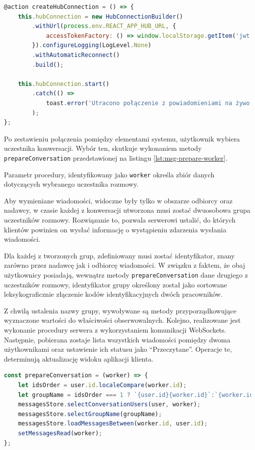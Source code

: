 \begin{lstlisting}[label=lst:msg-initHub,caption=Kod metody inicjującej połączenie WebSocket dla komunikatora tekstowego, captionpos=b,basicstyle=\footnotesize\ttfamily,language=JavaScript]
@action createHubConnection = () => {
	this.hubConnection = new HubConnectionBuilder()
		.withUrl(process.env.REACT_APP_HUB_URL, {
			accessTokenFactory: () => window.localStorage.getItem('jwt'),
		}).configureLogging(LogLevel.None)
		.withAutomaticReconnect()
		.build();

	this.hubConnection.start()
		.catch(() =>
			toast.error('Utracono połączenie z powiadomieniami na żywo. Odśwież stronę w celu ponownego połączenia')
		);
};
\end{lstlisting}

Po zestawieniu połączenia pomiędzy elementami systemu, użytkownik wybiera uczestnika konwersacji. Wybór ten, skutkuje wykonaniem metody \texttt{prepareConversation} przedstawionej na listingu \ref{lst:msg-prepare-worker}.

Parametr procedury, identyfikowany jako \texttt{worker} określa zbiór danych dotyczących wybranego uczestnika rozmowy.

Aby wymieniane wiadomości, widoczne były tylko w obszarze odbiorcy oraz nadawcy, w czasie każdej z konwersacji utworzona musi zostać dwuosobowa grupa uczestników rozmowy. Rozwiązanie to, pozwala serwerowi ustalić, do których klientów powinien on wysłać informację o wystąpieniu zdarzenia wysłania wiadomości.

Dla każdej z tworzonych grup, zdefiniowany musi zostać identyfikator, znany zarówno przez nadawcę jak i odbiorcę wiadomości. W związku z faktem, że obaj użytkownicy posiadają, wewnątrz metody \texttt{prepareConversation} dane drugiego z uczestników rozmowy, identyfikator grupy określony został jako sortowane leksykograficznie złączenie kodów identyfikacyjnych dwóch pracowników.

Z chwilą ustalenia nazwy grupy, wywoływane są metody przyporządkowujące wyznaczone wartości do właściwości obserwowalnych. Kolejno, realizowane jest wykonanie procedury serwera z wykorzystaniem komunikacji WebSockets. Następnie, pobierana zostaje lista wszystkich wiadomości pomiędzy dwoma użytkownikami oraz ustawienie ich statusu jako "`Przeczytane"'. Operacje te, determinują aktualizację widoku aplikacji klienta.

\begin{lstlisting}[label=lst:msg-prepare-worker,caption=Kod metody wyboru uczestnika konwersacji tekstowej, captionpos=b,basicstyle=\footnotesize\ttfamily,language=JavaScript]
const prepareConversation = (worker) => {
	let idsOrder = user.id.localeCompare(worker.id);
	let groupName = idsOrder === 1 ? `{user.id}{worker.id}`:`{worker.id}{user.id}`;
	messagesStore.selectConversationUsers(user, worker);
	messagesStore.selectGroupName(groupName);
	messagesStore.loadMessagesBetween(worker.id, user.id);
	setMessagesRead(worker);
};
\end{lstlisting}

